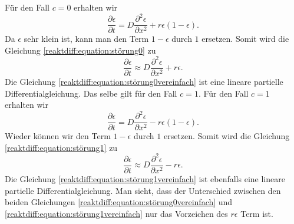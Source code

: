 Für den Fall \(c = 0\) erhalten wir
\begin{equation}
\label{reaktdiff:equation:störung0}
\frac{\partial \epsilon}{\partial t} = D \frac{\partial^2 \epsilon}{\partial x^2} + r\epsilon(1-\epsilon).
\end{equation}
Da \(\epsilon\) sehr klein ist, kann man den Term \(1-\epsilon\) durch \(1\) ersetzen.
Somit wird die Gleichung \eqref{reaktdiff:equation:störung0} zu
\begin{equation}
\label{reaktdiff:equation:störung0vereinfach}
\frac{\partial \epsilon}{\partial t} \approx D \frac{\partial^2 \epsilon}{\partial x^2}  + r\epsilon.
\end{equation}
Die Gleichung \ref{reaktdiff:equation:störung0vereinfach} ist eine lineare partielle Differentialgleichung.
Das selbe gilt für den Fall \(c = 1\).
Für den Fall \(c = 1\) erhalten wir
\begin{equation}
\label{reaktdiff:equation:störung1}
\frac{\partial \epsilon}{\partial t} = D \frac{\partial^2 \epsilon}{\partial x^2} - r\epsilon(1-\epsilon).
\end{equation}
Wieder können wir den Term \(1-\epsilon\) durch \(1\) ersetzen.
Somit wird die Gleichung \ref{reaktdiff:equation:störung1} zu
\begin{equation}
\label{reaktdiff:equation:störung1vereinfach}
\frac{\partial \epsilon}{\partial t} \approx D \frac{\partial^2 \epsilon}{\partial x^2} - r\epsilon.
\end{equation}
Die Gleichung \eqref{reaktdiff:equation:störung1vereinfach} ist ebenfalls eine lineare partielle Differentialgleichung.
Man sieht, dass der Unterschied zwischen den beiden Gleichungen \eqref{reaktdiff:equation:störung0vereinfach} und \eqref{reaktdiff:equation:störung1vereinfach} nur das Vorzeichen des \(r\epsilon\) Term ist.

